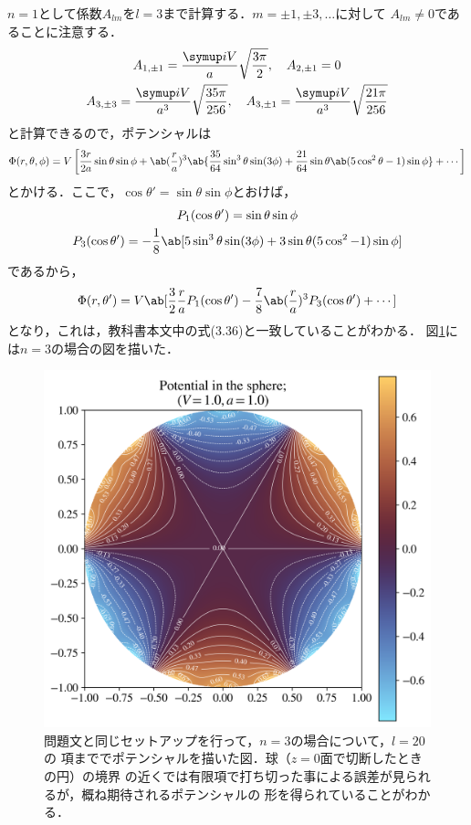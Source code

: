   $n = 1$として係数$A_{lm}$を$l = 3$まで計算する．$m = \pm 1, \pm 3, \ldots$に対して
  $A_{lm} \neq 0$であることに注意する．
  \begin{gather*}%
    A_{1,\pm 1} = \frac{\i V}{a}\sqrt{\frac{3\pi}{2}},\qq
    A_{2,\pm 1} = 0\\
    A_{3,\pm 3} = \frac{\i V}{a^3} \sqrt{\frac{35\pi}{256}},\qq
    A_{3,\pm 1} = \frac{\i V}{a^3} \sqrt{\frac{21\pi}{256}}
  \end{gather*}%
  と計算できるので，ポテンシャルは
  \begin{gather}%
    \Phi(r,\theta,\phi) = V\left[
      \frac{3r}{2a} \sin\theta\sin\phi
      +
      \ab(\frac{r}{a})^3\ab\{
        \frac{35}{64}\sin^3\theta\sin(3\phi) + 
        \frac{21}{64}\sin\theta\ab(5\cos^2\theta-1)\sin\phi
      \} + \cdots
      \right]
  \end{gather}%
  とかける．ここで，$\cos\theta' = \sin\theta \sin\phi$とおけば，
  \begin{gather}%
    P_1(\cos\theta') = \sin\theta\sin\phi\\
    P_3(\cos\theta') = -\frac{1}{8}\ab[5\sin^3\theta\sin(3\phi) 
    + 3\sin\theta(5\cos^2-1)\sin\phi]
  \end{gather}%
  であるから，
  \begin{gather}%
    \Phi(r,\theta') = V\ab[\frac{3}{2} \frac ra P_1(\cos\theta') - 
    \frac{7}{8}\ab(\frac ra)^3P_3(\cos\theta') + \cdots]
  \end{gather}%
  となり，これは，教科書本文中の式(3.36)と一致していることがわかる．
  図\ref{fig:3-4_n3}には$n = 3$の場合の図を描いた．
  \begin{figure}[htbp]%
    \centering%
    \includegraphics[width=0.5\linewidth]{py/3-4_n3.png}%
    \caption{問題文と同じセットアップを行って，$n = 3$の場合について，$l = 20$の
    項まででポテンシャルを描いた図．球（$z = 0$面で切断したときの円）の境界
    の近くでは有限項で打ち切った事による誤差が見られるが，概ね期待されるポテンシャルの
    形を得られていることがわかる．}%
    \label{fig:3-4_n3}%
  \end{figure}%

